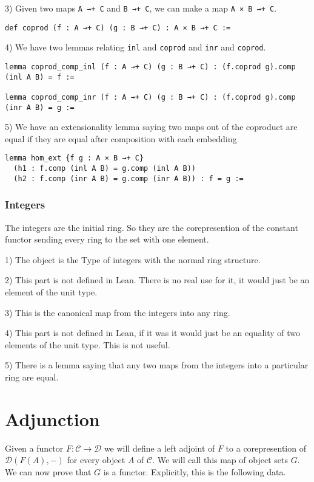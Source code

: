 \documentclass[12pt]{article} %
\theoremstyle{definition}
\theoremstyle{definition}
\theoremstyle{definition}
\theoremstyle{definition}
\begin{document}
3) Given two maps \lstinline{A →+ C} and \lstinline{B →+ C}, we can make a map
\lstinline{A × B →+ C}.
\begin{lstlisting}
def coprod (f : A →+ C) (g : B →+ C) : A × B →+ C :=
\end{lstlisting}

4) We have two lemmas relating \lstinline{inl} and \lstinline{coprod} and \lstinline{inr}
and \lstinline{coprod}.
\begin{lstlisting}
lemma coprod_comp_inl (f : A →+ C) (g : B →+ C) : (f.coprod g).comp (inl A B) = f :=

lemma coprod_comp_inr (f : A →+ C) (g : B →+ C) : (f.coprod g).comp (inr A B) = g :=
\end{lstlisting}

5) We have an extensionality lemma saying two maps out of the coproduct are equal 
if they are equal after composition with each embedding
\begin{lstlisting}
lemma hom_ext {f g : A × B →+ C}
  (h1 : f.comp (inl A B) = g.comp (inl A B)) 
  (h2 : f.comp (inr A B) = g.comp (inr A B)) : f = g :=
\end{lstlisting}

\subsubsection{Integers}
The integers are the initial ring. So they are the corepresention of the 
constant functor sending every ring to the set with one element.

1) The object is the Type of integers with the normal ring structure.

2) This part is not defined in Lean. There is no real use for it, it would just be an element of 
the unit type.

3) This is the canonical map from the integers into any ring.

4) This part is not defined in Lean, if it was it would just be an equality of two 
elements of the unit type. This is not useful.

5) There is a lemma saying that any two maps from the integers into a particular ring are equal.

\section{Adjunction}

Given a functor $F : \mathcal{C} \to \mathcal{D}$ we will define a left adjoint of $F$ to 
a corepresention of $\mathcal{D}(F(A),-)$ for every object $A$ of $\mathcal{C}$. We will call
this map of object sets $G$. We can now prove that $G$ is a functor. Explicitly,
this is the following data.
\end{document}
